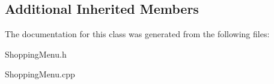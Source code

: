 \subsection*{Additional Inherited Members}


The documentation for this class was generated from the following files\+:\begin{DoxyCompactItemize}
\item 
Shopping\+Menu.\+h\item 
Shopping\+Menu.\+cpp\end{DoxyCompactItemize}
